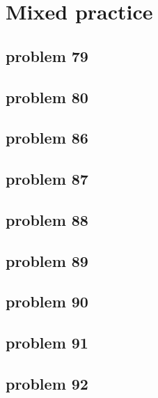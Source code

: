 \section{Mixed practice}

\subsection{problem 79}


\subsection{problem 80}


\subsection{problem 86}


\subsection{problem 87}


\subsection{problem 88}


\subsection{problem 89}


\subsection{problem 90}


\subsection{problem 91}


\subsection{problem 92}
